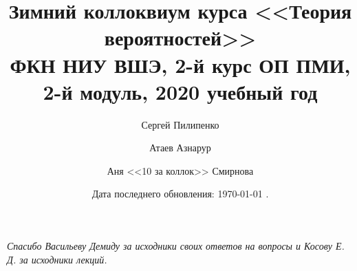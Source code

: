 \documentclass[10pt]{article}
\title{\Large{\bf Зимний коллоквиум курса <<Теория вероятностей>>} \\ ФКН НИУ ВШЭ, 2-й курс ОП ПМИ, 2-й модуль, 2020 учебный год}
\author{Сергей Пилипенко \and Атаев Азнарур \and Аня <<10 за коллок>> Смирнова}
\date{Дата последнего обновления: {\ddmmyyyydate\today} \currenttime.}
\begin{document}
    \maketitle

    {\it Спасибо Васильеву Демиду за исходники своих ответов на вопросы и Косову Е. Д. за исходники лекций.}

    \tableofcontents

    
    
    
    
    
    
    
    
    
    
    
    
\end{document}
